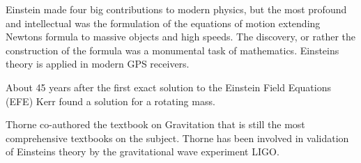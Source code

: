 {Einstein made four big contributions to modern physics, but the most
profound and intellectual was the formulation of the equations of motion
extending Newtons formula to massive objects and high speeds. The 
discovery, or rather the construction of the formula was a monumental
task of mathematics. Einsteins theory is applied in modern GPS receivers.}

{About 45 years after the first exact solution to the Einstein Field Equations (EFE)
Kerr found a solution for a rotating mass.}

{Thorne co-authored the textbook on Gravitation that is still the most
comprehensive textbooks on the subject. Thorne has been involved 
in validation of Einsteins theory by the gravitational wave experiment LIGO.}



